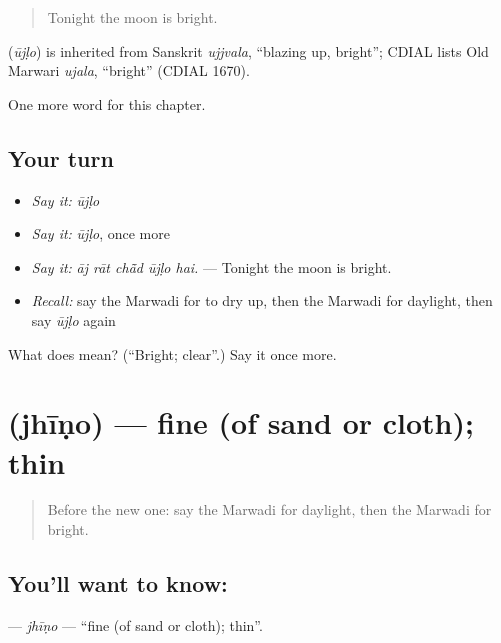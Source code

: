 \begin{quote}
Tonight the moon is bright.
\end{quote}

\begin{cousinweb}
\textbf{} (\emph{ūjḷo}) is inherited from Sanskrit \emph{ujjvala}, \textquotedblleft{}blazing up, bright\textquotedblright{}; CDIAL lists Old Marwari \emph{ujala}, \textquotedblleft{}bright\textquotedblright{} (CDIAL 1670).
\end{cousinweb}

\begin{grammarlens}[title={What you've built}]
One more word for this chapter.
\end{grammarlens}

\subsection*{Your turn}
\begin{itemize}
\raggedright
  \item \emph{Say it:} \emph{ūjḷo}
  \item \emph{Say it:} \emph{ūjḷo}, once more
  \item \emph{Say it:} \emph{āj rāt chā̃d ūjḷo hai.} — Tonight the moon is bright.
  \item \emph{Recall:} say the Marwadi for to dry up, then the Marwadi for daylight, then say \emph{ūjḷo} again
\end{itemize}

\begin{tcolorbox}[breakable,colback=teal!4,colframe=teal!35!black,title={Before you move on}]
What does  mean? (\textquotedblleft{}Bright; clear\textquotedblright{}.) Say it once more.
\end{tcolorbox}
\section[\texorpdfstring{\mw{झीणो} (jhīṇo)}{झीणो (jhīṇo)}]{ (jhīṇo) — fine (of sand or cloth); thin}

\label{lesson:MW-C229-jhino}



\begin{quote}
Before the new one: say the Marwadi for daylight, then the Marwadi for bright.
\end{quote}

\subsection*{You'll want to know: }
\textbf{} — \emph{jhīṇo} — \textquotedblleft{}fine (of sand or cloth); thin\textquotedblright{}.

